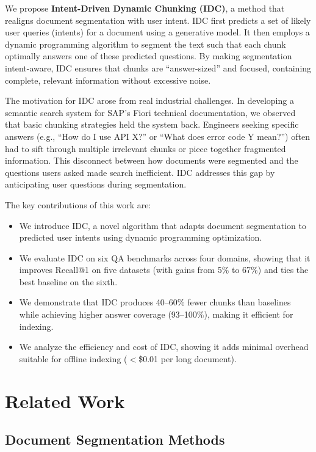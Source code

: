 \documentclass[conference]{IEEEtran}
\begin{document}
We propose \textbf{Intent-Driven Dynamic Chunking (IDC)}, a method that realigns document segmentation with user intent. IDC first predicts a set of likely user queries (intents) for a document using a generative model. It then employs a dynamic programming algorithm to segment the text such that each chunk optimally answers one of these predicted questions. By making segmentation intent-aware, IDC ensures that chunks are ``answer-sized'' and focused, containing complete, relevant information without excessive noise.

The motivation for IDC arose from real industrial challenges. In developing a semantic search system for SAP's Fiori technical documentation, we observed that basic chunking strategies held the system back. Engineers seeking specific answers (e.g., ``How do I use API X?'' or ``What does error code Y mean?'') often had to sift through multiple irrelevant chunks or piece together fragmented information. This disconnect between how documents were segmented and the questions users asked made search inefficient. IDC addresses this gap by anticipating user questions during segmentation.

The key contributions of this work are:
\begin{itemize}
    \item We introduce IDC, a novel algorithm that adapts document segmentation to predicted user intents using dynamic programming optimization.
    \item We evaluate IDC on six QA benchmarks across four domains, showing that it improves Recall@1 on five datasets (with gains from 5\% to 67\%) and ties the best baseline on the sixth.
    \item We demonstrate that IDC produces 40--60\% fewer chunks than baselines while achieving higher answer coverage (93--100\%), making it efficient for indexing.
    \item We analyze the efficiency and cost of IDC, showing it adds minimal overhead suitable for offline indexing ($<$\$0.01 per long document).
\end{itemize}

\section{Related Work}

\subsection{Document Segmentation Methods}
\end{document}
